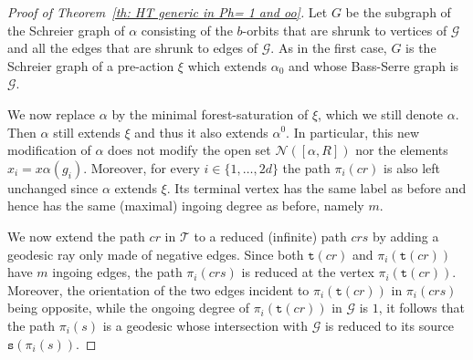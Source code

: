 \documentclass[12pt]{article}
\numberwithin{equation}{section}
\theoremstyle{definition}
\newcommand{\Gc}{\mathcal{G}}
\newcommand\Tree{\mathcal{T}}
\newcommand{\source}{\mathtt{s}}
\newcommand{\target}{\mathtt{t}}
\begin{document}
\begin{proof}[Proof of Theorem~\ref{th: HT generic in Ph= 1 and oo}]
    Let $G$ be the subgraph of the Schreier graph of \( \alpha \) consisting of the \( b \)-orbits that are shrunk to vertices of $\mathcal G$ 
    and all the edges that are shrunk to edges of $\mathcal{G}$. 
    As in the first case, $G$ is the Schreier graph of a pre-action \( \xi \) which 
    extends \( \alpha_0 \) and whose Bass-Serre graph is $\mathcal G$.
    
    We now replace \( \alpha \) by the minimal forest-saturation of \( \xi \), which we still denote \( \alpha \). 
    Then \( \alpha \) still extends \( \xi \) and thus it also extends $\alpha^0$. 
    In particular, this new modification of \( \alpha \) does not modify the open set $\mathcal N([\alpha,R])$ nor the elements $x_i=x\alpha(g_i)$. 
	Moreover, for every $i\in\{1,\dots,2d\}$ the path $\pi_i(cr)$ is also left unchanged since \( \alpha \) extends \( \xi \).
	Its terminal vertex has the same label as before and hence has the same (maximal) ingoing degree as before, namely $m$.
	

   
    We now extend the path $cr$ in $\Tree$ to a reduced (infinite) path $crs$ by adding a geodesic ray only made  of negative edges. 
    Since both $\target (cr)$ and $\pi_i(\target(cr))$ have $m$ ingoing edges, the path $\pi_i(crs)$ is reduced at the vertex $\pi_i(\target(cr))$. Moreover, the orientation of the two edges incident to $\pi_i(\target(cr))$ in $\pi_i(crs)$ being opposite, while the ongoing degree of $\pi_i(\target(cr))$ in $\mathcal G$ is $1$, it follows that the path $\pi_i(s)$ 
    is a geodesic whose intersection with $\Gc$ is reduced to its source $\source(\pi_i(s))$.


\end{proof}
\end{document}
